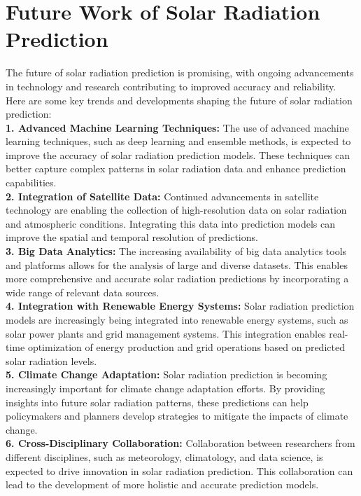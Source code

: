 \documentclass[12pt,a4paper]{report}
\begin{document}
\chapter{Future Work of Solar Radiation Prediction}  
The future of solar radiation prediction is promising, with ongoing advancements in 
technology and research contributing to improved accuracy and reliability. Here are 
some key trends and developments shaping the future of solar radiation prediction:\\ 
\textbf{1. Advanced Machine Learning Techniques:} The use of advanced machine learning 
techniques, such as deep learning and ensemble methods, is expected to improve the 
accuracy of solar radiation prediction models. These techniques can better capture 
complex patterns in solar radiation data and enhance prediction capabilities. \\
\textbf{2. Integration of Satellite Data:} Continued advancements in satellite technology are 
enabling the collection of high-resolution data on solar radiation and atmospheric 
conditions. Integrating this data into prediction models can improve the spatial and 
temporal resolution of predictions.\\
\textbf{3. Big Data Analytics:} The increasing availability of big data analytics tools and 
platforms allows for the analysis of large and diverse datasets. This enables more 
comprehensive and accurate solar radiation predictions by incorporating a wide range 
of relevant data sources. \\
\textbf{4. Integration with Renewable Energy Systems:} Solar radiation prediction models 
are increasingly being integrated into renewable energy systems, such as solar power 
plants and grid management systems. This integration enables real-time optimization 
of energy production and grid operations based on predicted solar radiation levels. \\
\textbf{5. Climate Change Adaptation:} Solar radiation prediction is becoming increasingly 
important for climate change adaptation efforts. By providing insights into future solar 
radiation patterns, these predictions can help policymakers and planners develop 
strategies to mitigate the impacts of climate change.\\
\textbf{6. Cross-Disciplinary Collaboration:} Collaboration between researchers from 
different disciplines, such as meteorology, climatology, and data science, is expected 
to drive innovation in solar radiation prediction. This collaboration can lead to the 
development of more holistic and accurate prediction models. \\
\end{document}
